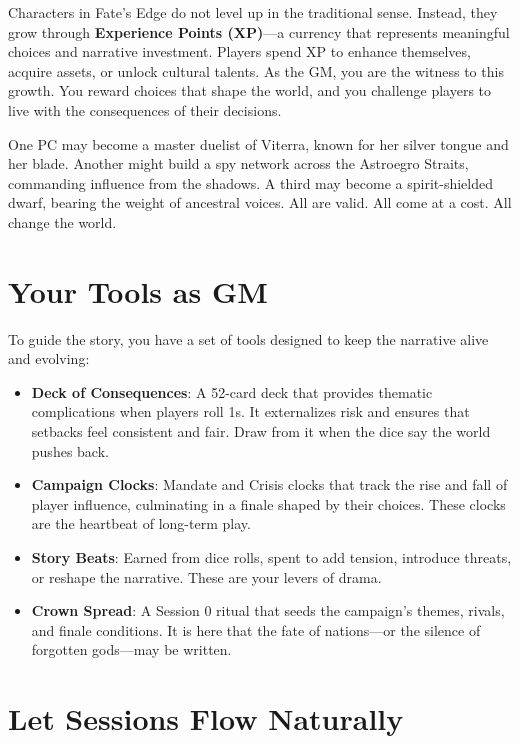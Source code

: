 Characters in Fate's Edge do not level up in the traditional sense. Instead, they grow through \textbf{Experience Points (XP)}---a currency that represents meaningful choices and narrative investment. Players spend XP to enhance themselves, acquire assets, or unlock cultural talents. As the GM, you are the witness to this growth. You reward choices that shape the world, and you challenge players to live with the consequences of their decisions.

One PC may become a master duelist of Viterra, known for her silver tongue and her blade. Another might build a spy network across the Astroegro Straits, commanding influence from the shadows. A third may become a spirit-shielded dwarf, bearing the weight of ancestral voices. All are valid. All come at a cost. All change the world.

\section*{Your Tools as GM}

To guide the story, you have a set of tools designed to keep the narrative alive and evolving:

\begin{itemize}
    \item \textbf{Deck of Consequences}: A 52-card deck that provides thematic complications when players roll 1s. It externalizes risk and ensures that setbacks feel consistent and fair. Draw from it when the dice say the world pushes back.
    \item \textbf{Campaign Clocks}: Mandate and Crisis clocks that track the rise and fall of player influence, culminating in a finale shaped by their choices. These clocks are the heartbeat of long-term play.
    \item \textbf{Story Beats}: Earned from dice rolls, spent to add tension, introduce threats, or reshape the narrative. These are your levers of drama.
    \item \textbf{Crown Spread}: A Session 0 ritual that seeds the campaign's themes, rivals, and finale conditions. It is here that the fate of nations---or the silence of forgotten gods---may be written.
\end{itemize}

\section*{Let Sessions Flow Naturally}

